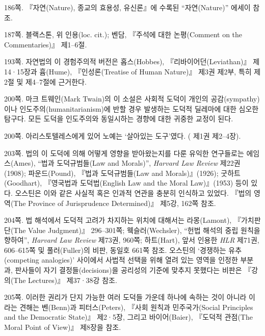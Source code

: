 {\noteentry 186쪽.  『자연(Nature), 종교의 효용성,
유신론』에 수록된 “자연(Nature)” 에세이 참조.

\noteentry 187쪽.  블랙스톤, 위
인용(loc. cit.); 벤담, 『주석에 대한 논평(Comment on the Commentaries)』
제1--6절.

\noteentry 193쪽.  자연법의 이 경험주의적 버전은
홉스(Hobbes), 『리바이어던(Leviathan)』 제14·15장과 흄(Hume),
『인성론(Treatise of Human Nature)』 제3권 제2부, 특히 제2절 및
제4--7절에 근거한다.

\noteentry 200쪽.  마크 트웨인(Mark
Twain)의 이 소설은 사회적 도덕이 개인의 공감(sympathy)이나
인도주의(humanitarianism)에 반할 경우 발생하는 도덕적 딜레마에 대한
심오한 탐구다. 모든 도덕을 인도주의와 동일시하는 경향에 대한 귀중한
교정이 된다.

\noteentry 200쪽.  아리스토텔레스에게 있어 노예는 ‘살아있는
도구’였다. ( 제1권 제2--4장).

\noteentry 203쪽.  법의 이
도덕에 의해 어떻게 영향을 받아왔는지를 다룬 유익한 연구들로는
에임스(Ames), “법과 도덕규범들(Law and Morals)”, \emph{Harvard Law
Review} 제22권(1908); 파운드(Pound), 『법과 도덕규범들(Law and
Morals)』(1926); 굿하트(Goodhart), 『영국법과 도덕법(English Law and the
Moral Law)』(1953) 등이 있다. 오스틴은 이와 같은 사실적 혹은 인과적
연관을 충분히 인식하고 있었다. 『법의 영역(The Province of Jurisprudence
Determined)』 제5강, 162쪽 참조.

\noteentry 204쪽.  법 해석에서 도덕적 고려가 차지하는
위치에 대해서는 라몽(Lamont), 『가치판단(The Value Judgment)』
296--301쪽; 웩슬러(Wechsler), “헌법 해석의 중립 원칙을 향하여”,
\emph{Harvard Law Review} 제73권, 960쪽; 하트(Hart), 앞서 인용한
\emph{HLR} 제71권, 606--615쪽 및 풀러(Fuller)의 비판, 동일호 661쪽
 참조. 오스틴의 ‘경쟁하는 유추(competing
analogies)’ 사이에서 사법적 선택을 위해 열려 있는 영역을 인정한 부분과,
판사들이 자기 결정들(decisions)을 공리성의 기준에 맞추지 못했다는 비판은
『강의(The Lectures)』 제37·38강 참조.

\noteentry 205쪽.  이러한 권리가 단지 가능한 여러 도덕들 가운데 하나에 속하는 것이 아니라
이라는 견해는
벤(Benn)과 피터스(Peters), 『사회 원칙과 민주국가(Social Principles and
the Democratic State)』 제2·5장, 그리고 바이어(Baier), 『도덕적 관점(The
Moral Point of View)』 제8장을 참조.

}
